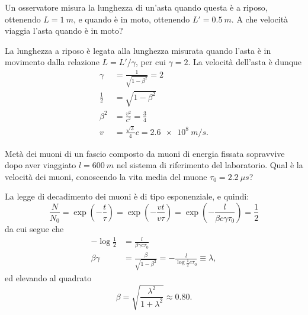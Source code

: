 \documentclass{article}
\begin{document}
\begin{Exercise}[title={Contrazione delle lunghezze}]
  Un osservatore misura la lunghezza di un'asta quando questa \`e a
  riposo, ottenendo $L=\SI{1}{m}$, e quando \`e in moto, ottenendo
  $L'=\SI{0.5}{m}$. A che velocit\`a viaggia l'asta quando \`e in moto?
\end{Exercise}
\begin{Answer}
La lunghezza a riposo \`e legata alla lunghezza misurata quando l'asta \`e
in movimento dalla relazione $L=L'/\gamma$, per cui $\gamma=2$. La
velocit\`a dell'asta \`e dunque
\begin{align*}
    \gamma &= \frac{1}{\sqrt{1-\beta^2}} = 2\\
    \frac{1}{2} &= \sqrt{1-\beta^2}\\
    \beta^2&=\frac{v^2}{c^2} = \frac{3}{4}\\
    v &= \frac{\sqrt{3}}{4}c=\SI{2.6e8}{m/s}.
\end{align*}
\end{Answer}


\begin{Exercise}[title={Decadimento e dilatazione dei tempi}]
Met\`a dei muoni di un fascio composto da muoni di energia fissata
sopravvive dopo aver viaggiato $l=\SI{600}{m}$ nel sistema di
riferimento del laboratorio. Qual è la velocità dei muoni, conoscendo la vita media del muone $\tau_0=\SI{2.2}{\mu s}$?
\end{Exercise}
\begin{Answer}
La legge di decadimento dei muoni \`e di tipo esponenziale, e quindi:
\begin{equation*}
    \frac{N}{N_0} = \exp\left(-\frac{t}{\tau}\right) = \exp\left(-\frac{vt}{v\tau}\right)=\exp\left(-\frac{l}{\beta c\gamma \tau_0}\right)=\frac{1}{2}
\end{equation*}
da cui segue che
\begin{align*}
    -\log\frac{1}{2}&=\frac{l}{\beta\gamma c\tau_0}\\
    \beta\gamma&=\frac{\beta}{\sqrt{1-\beta^2}} = -\frac{l}{\log\frac{1}{2}c\tau_0}\equiv\lambda,
\end{align*}
ed elevando al quadrato
\begin{equation*}
    \beta=\sqrt{\frac{\lambda^2}{1+\lambda^2}}\approx 0.80.
\end{equation*}
\end{Answer}
\end{document}
